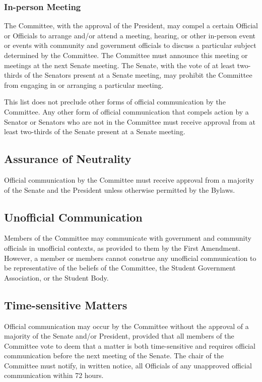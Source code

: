 \documentclass[12pt]{scrreprt}
\begin{document}
\subsubsection{In-person Meeting}
The Committee, with the approval of the President, may compel a certain
Official or Officials to arrange and/or attend a meeting, hearing, or other
in-person event or events with community and government officials to
discuss a particular subject determined by the Committee. The
Committee must announce this meeting or meetings at the next Senate
meeting. The Senate, with the vote of at least two-thirds of the Senators
present at a Senate meeting, may prohibit the Committee from engaging
in or arranging a particular meeting.

This list does not preclude other forms of official communication by the Committee. Any
other form of official communication that compels action by a Senator or Senators who
are not in the Committee must receive approval from at least two-thirds of the Senate
present at a Senate meeting.

\subsection{Assurance of Neutrality}
Official communication by the Committee must receive approval from a majority of the
Senate and the President unless otherwise permitted by the Bylaws.

\subsection{Unofficial Communication}
Members of the Committee may communicate with government and community officials
in unofficial contexts, as provided to them by the First Amendment. However, a member
or members cannot construe any unofficial communication to be representative of the
beliefs of the Committee, the Student Government Association, or the Student Body.

\subsection{Time-sensitive Matters}
Official communication may occur by the Committee without the approval of a majority
of the Senate and/or President, provided that all members of the Committee vote to
deem that a matter is both time-sensitive and requires official communication before the
next meeting of the Senate. The chair of the Committee must notify, in written notice, all
Officials of any unapproved official communication within 72 hours.
\end{document}
